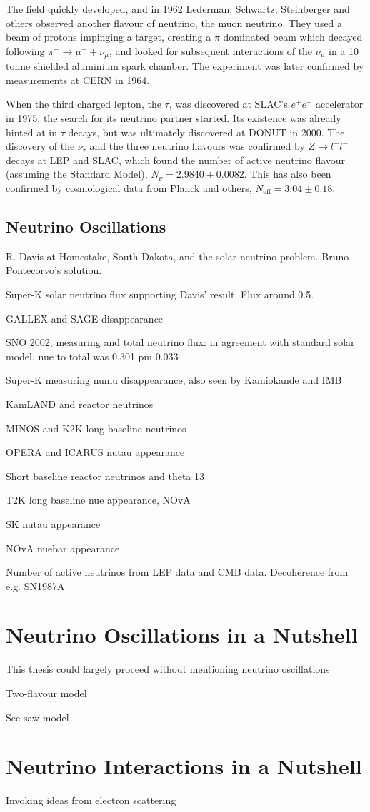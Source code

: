 The field quickly developed, and in 1962 Lederman, Schwartz, Steinberger and others\cite{lederman} observed another flavour of neutrino, the muon neutrino. They used a beam of protons impinging a target, creating a $\pi$ dominated beam which decayed following $\pi^+ \rightarrow \mu^+ + \nu_\mu$, and looked for subsequent interactions of the $\nu_\mu$ in a 10 tonne shielded aluminium spark chamber. The experiment was later confirmed by measurements at CERN in 1964\cite{cern_spark,cern_spark2}.

When the third charged lepton, the $\tau$, was discovered at SLAC's $e^+e^-$ accelerator in 1975\cite{tau_disc}, the search for its neutrino partner started. Its existence was already hinted at in $\tau$ decays, but was ultimately discovered at DONUT\cite{tau_nu_disc} in 2000. The discovery of the $\nu_\tau$ and the three neutrino flavours was confirmed by $Z \rightarrow l^+ l^-$ decays at LEP and SLAC\cite{lep}, which found the number of active neutrino flavour (assuming the Standard Model), $N_\nu = 2.9840\pm0.0082$. This has also been confirmed by cosmological data from Planck and others\cite{planck}, $N_\text{eff} = 3.04\pm0.18$.

\subsection{Neutrino Oscillations}

R. Davis at Homestake, South Dakota, and the solar neutrino problem. Bruno Pontecorvo's solution.

Super-K solar neutrino flux supporting Davis' result. Flux around 0.5.

GALLEX and SAGE \nue disappearance

SNO 2002, measuring \nue and total neutrino flux: in agreement with standard solar model. nue to total was 0.301 pm 0.033

Super-K measuring numu disappearance, also seen by Kamiokande and IMB

KamLAND and reactor neutrinos

MINOS and K2K long baseline neutrinos

OPERA and ICARUS nutau appearance

Short baseline reactor neutrinos and theta 13

T2K long baseline nue appearance, NOvA

SK nutau appearance

NOvA nuebar appearance

Number of active neutrinos from LEP data and CMB data. Decoherence from e.g. SN1987A

\section{Neutrino Oscillations in a Nutshell}
\label{sec:theory:osc}
This thesis could largely proceed without mentioning neutrino oscillations

Two-flavour model

See-saw model

\section{Neutrino Interactions in a Nutshell}
\label{sec:theory:int}
Invoking ideas from electron scattering